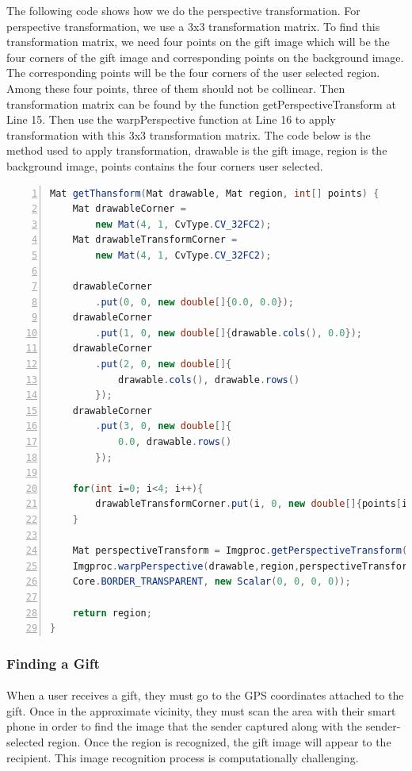 \par The following code shows how we do the perspective transformation. For perspective transformation, we use a 3x3 transformation matrix. To find this transformation matrix, we need four points on the gift image which will be the four corners of the gift image and corresponding points on the background image. The corresponding points will be the four corners of the user selected region.  Among these four points, three of them should not be collinear. Then transformation matrix can be found by the function getPerspectiveTransform at Line 15. Then use the warpPerspective function at Line 16  to apply transformation with this 3x3 transformation matrix. The code below is the method used to apply transformation, drawable is the gift image, region is the background image, points contains the four corners user selected.

\begin{lstlisting}[caption={Gift Transform},language={java},
        numbers=left,basicstyle=\footnotesize\ttfamily,breaklines=true,xleftmargin=.1\textwidth, xrightmargin=.1\textwidth]
Mat getThansform(Mat drawable, Mat region, int[] points) {
    Mat drawableCorner = 
        new Mat(4, 1, CvType.CV_32FC2);
    Mat drawableTransformCorner = 
        new Mat(4, 1, CvType.CV_32FC2);

    drawableCorner
        .put(0, 0, new double[]{0.0, 0.0});
    drawableCorner
        .put(1, 0, new double[]{drawable.cols(), 0.0});
    drawableCorner
        .put(2, 0, new double[]{ 
            drawable.cols(), drawable.rows()
        });
    drawableCorner
        .put(3, 0, new double[]{
            0.0, drawable.rows()
        });
    
    for(int i=0; i<4; i++){
        drawableTransformCorner.put(i, 0, new double[]{points[i*2], points[i*2+1]});
    }

    Mat perspectiveTransform = Imgproc.getPerspectiveTransform(drawableCorner, drawableTransformCorner);
    Imgproc.warpPerspective(drawable,region,perspectiveTransform, region.size(), Imgproc.INTER_LINEAR,
    Core.BORDER_TRANSPARENT, new Scalar(0, 0, 0, 0));

    return region;
}
\end{lstlisting} 
\subsubsection{Finding a Gift}
\paragraph{}
When a user receives a gift, they must go to the GPS coordinates attached to the gift.  Once in the approximate vicinity, they must scan the area with their smart phone in order to find the image that the sender captured along with the sender-selected region. Once the region is recognized, the gift image will appear to the recipient. This image recognition process is computationally challenging.

